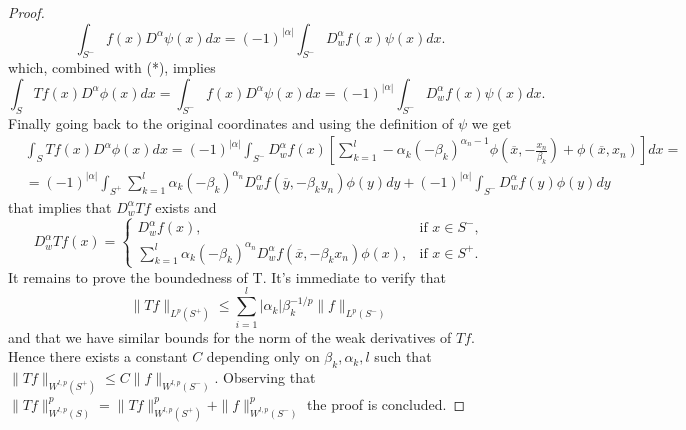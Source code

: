 \documentclass[12pt]{article}
\theoremstyle{definition}
\begin{document}
\begin{proof}
\[ \int_{S^-}  f(x)D^{\alpha}\psi(x) dx = (-1)^{|\alpha|}\int_{S^-} D^\alpha_wf(x)\psi(x)  dx.  \]
which, combined with (*), implies
\[ \int_S Tf(x)D^{\alpha}\phi(x)dx=  \int_{S^-}  f(x)D^{\alpha}\psi(x) dx = (-1)^{|\alpha|}\int_{S^-} D^\alpha_wf(x)\psi(x)  dx. \]
Finally going back to the original coordinates and using the definition of $\psi$ we get
\begin{align*}
& \int_S Tf(x)D^{\alpha}\phi(x)dx = (-1)^{|\alpha|} \int_{S^-}D^\alpha_w f(x) \left[\sum_{k=1}^l -\alpha_k (-\beta_k)^{\alpha_n-1}\phi \left( \overline x,-\frac{x_n}{\beta_k} \right)+\phi(\overline x,x_n)\right] dx=\\
					&= (-1)^{|\alpha|} \int_{S^+} \sum_{k=1}^l \alpha_k (-\beta_k)^{\alpha_n} D^\alpha_w f(\overline y,-\beta_k y_n)\phi(y)dy +(-1)^{|\alpha|} \int_{S^-} D^\alpha_w f(y)\phi(y) dy
\end{align*}
that implies that $D^\alpha_wTf$ exists and 
\[ D^\alpha_wTf(x)= \begin{cases}
			 D^\alpha_w f(x),	& \text{if } x \in S^-, \\
			\sum_{k=1}^l \alpha_k (-\beta_k)^{\alpha_n} D^\alpha_w f(\overline x,-\beta_k x_n)\phi(x), & \text{if }x \in S^+.
		\end{cases}
 \]
It remains to prove the boundedness of  T. It's immediate to verify that
\[ \| Tf \|_{L^p(S^+)}\le \sum_{i=1}^l |\alpha_k|\beta_k^{-1/p} \| f\|_{L^p(S^-)} \] 
and that we have similar bounds for the norm of the weak derivatives of $Tf$. Hence there exists a constant $C$ depending only on $\beta_k,\alpha_k,l$ such that $\| Tf\|_{W^{l,p}(S^+)}\le C \| f\|_{W^{l,p}(S^-)} $. Observing that $\| Tf\|^p_{W^{l,p}(S)}=\| Tf\|^p_{W^{l,p}(S^+)}+\|f\|^p_{W^{l,p}(S^-)}$ the proof is concluded.
\end{proof}
\end{document}
